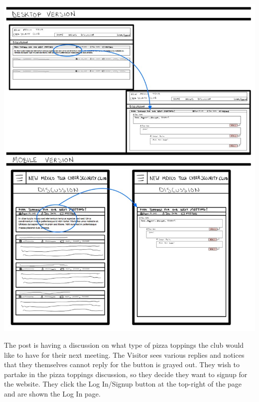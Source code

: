 \documentclass{article}
\begin{document}
\includegraphics[scale=0.60]{visitor_5.jpg}
\par The post is having a discussion on what type of pizza toppings the club would like to have for their next meeting.  The Visitor sees various replies and notices that they themselves cannot reply for the button is grayed out.  They wish to partake in the pizza toppings discussion, so they decide they want to signup for the website.  They click the Log In/Signup button at the top-right of the page and are shown the Log In page.
\par
\end{document}
